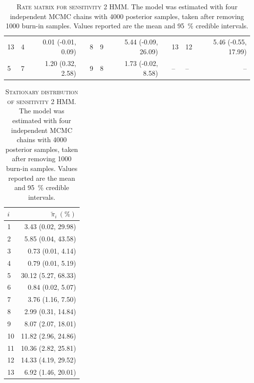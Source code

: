 \begin{table}[h!]
\begin{tabular}{llrp{0.2cm}llrp{0.2cm}llr}
 13 & 4 & 0.01 (-0.01, 0.09) & & 8 & 9 & 5.44 (-0.09, 26.09) & & 13 & 12 & 5.46 (-0.55, 17.99) \\
 5 & 7 & 1.20 (0.32, 2.58) & & 9 & 8 & 1.73 (-0.02, 8.58) & & -- & -- &   -- \\
 \hline
 \end{tabular}
 \caption[Rate matrix for sensitivity 2 HMM]{\textsc{Rate matrix for sensitivity 2 HMM}. The model was estimated with four independent MCMC chains with \num{4000} posterior samples, taken after removing \num{1000} burn-in samples. Values reported are the mean and \SI{95}{\percent} credible intervals.}
 \label{tab:sens_2_rate_matrix}
\end{table}

\begin{table}[h!]
 \centering
 \label{tab:sens_2_stat_dist}
 \begin{tabular}{lr}
 \toprule
 $i$ & $\widetilde{\pi}_{i}\ (\si{\percent})$ \\
 \midrule
 1 & 3.43 (0.02, 29.98) \\
 2 & 5.85 (0.04, 43.58) \\
 3 & 0.73 (0.01, 4.14) \\
 4 & 0.79 (0.01, 5.19) \\
 5 & 30.12 (5.27, 68.33) \\
 6 & 0.84 (0.02, 5.07) \\
 7 & 3.76 (1.16, 7.50) \\
 8 & 2.99 (0.31, 14.84) \\
 9 & 8.07 (2.07, 18.01) \\
 10 & 11.82 (2.96, 24.86) \\
 11 & 10.36 (2.82, 25.81) \\
 12 & 14.33 (4.19, 29.52) \\
 13 & 6.92 (1.46, 20.01) \\
 \bottomrule
 \end{tabular}
 \caption[Stationary distribution of sensitivity 2 HMM]{\textsc{Stationary distribution of sensitivity 2 HMM}. The model was estimated with four independent MCMC chains with \num{4000} posterior samples, taken after removing \num{1000} burn-in samples. Values reported are the mean and \SI{95}{\percent} credible intervals.}
\end{table}

